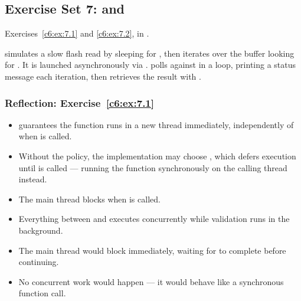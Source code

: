 \subsection{Exercise Set 7:  and }
\label{sol:set:c6.7}
Exercises~\ref{c6:ex:7.1} and \ref{c6:ex:7.2}, in .

 simulates a slow flash read by sleeping for , then iterates
over the buffer looking for . It is launched asynchronously via
.  polls
 against  in
a loop, printing a status message each iteration, then retrieves the result with
.


\subsubsection{Reflection: Exercise~\ref{c6:ex:7.1}}
\begin{itemize}
  \item {} guarantees the function runs in a new thread immediately,
    independently of when  is called.
  \item Without the policy, the implementation may choose , which
    defers execution until  is called --- running the function synchronously on the
    calling thread instead.
\end{itemize}

\begin{itemize}
  \item The main thread blocks when  is called.
  \item Everything between  and  executes concurrently while
    validation runs in the background.
\end{itemize}

\begin{itemize}
  \item The main thread would block immediately, waiting for  to complete
    before continuing.
  \item No concurrent work would happen --- it would behave like a synchronous function call.
\end{itemize}

